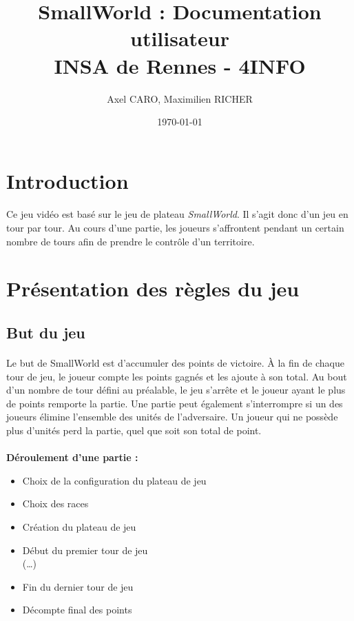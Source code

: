 \documentclass[a4paper]{article}
\title{SmallWorld : Documentation utilisateur \\ INSA de Rennes - 4INFO}
\author{Axel CARO, Maximilien RICHER}
\date{\today}
\begin{document}
\maketitle

\tableofcontents

\newpage

\section*{Introduction}
\paragraph{}
Ce jeu vidéo est basé sur le jeu de plateau \textit{SmallWorld}. Il s'agit donc d'un jeu en tour par tour.
Au cours d'une partie, les joueurs s'affrontent pendant un certain nombre de tours afin de prendre le contrôle d'un territoire.

\section{Présentation des règles du jeu}

\subsection{But du jeu}
\paragraph{}
Le but de SmallWorld est d'accumuler des points de victoire.
À la fin de chaque tour de jeu, le joueur compte les points gagnés et les ajoute à son total. Au bout d'un nombre de tour défini au préalable, le jeu s'arrête et le joueur ayant le plus de points remporte la partie. Une partie peut également s'interrompre si un des joueurs élimine l'ensemble des unités de l'adversaire. Un joueur qui ne possède plus d'unités perd la partie, quel que soit son total de point.

\paragraph{}
\textbf{Déroulement d'une partie : }
\begin{itemize}
    \item Choix de la configuration du plateau de jeu
    \item Choix des races
    \item Création du plateau de jeu
    \item Début du premier tour de jeu\\(\dots)
    \item Fin du dernier tour de jeu
    \item Décompte final des points
\end{itemize}
\end{document}
